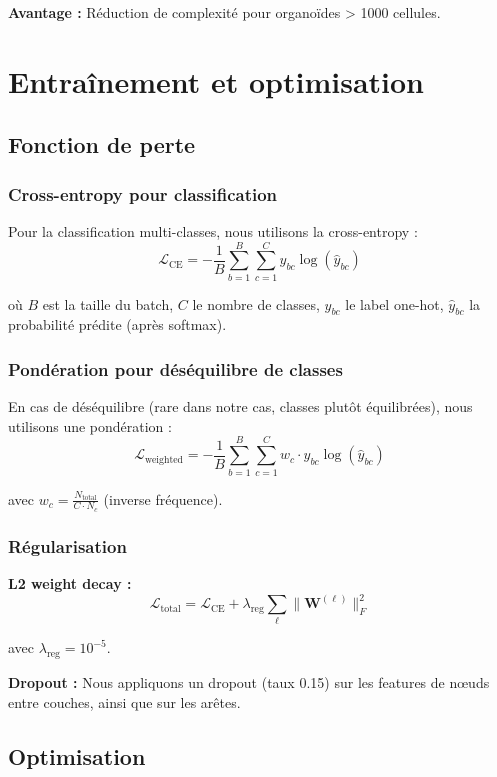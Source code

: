 \textbf{Avantage :} Réduction de complexité pour organoïdes > 1000 cellules.

\section{Entraînement et optimisation}

\subsection{Fonction de perte}

\subsubsection{Cross-entropy pour classification}

Pour la classification multi-classes, nous utilisons la cross-entropy :
\[
\mathcal{L}_{\text{CE}} = -\frac{1}{B}\sum_{b=1}^B \sum_{c=1}^C y_{bc} \log(\hat{y}_{bc})
\]

où $B$ est la taille du batch, $C$ le nombre de classes, $y_{bc}$ le label one-hot, $\hat{y}_{bc}$ la probabilité prédite (après softmax).

\subsubsection{Pondération pour déséquilibre de classes}

En cas de déséquilibre (rare dans notre cas, classes plutôt équilibrées), nous utilisons une pondération :
\[
\mathcal{L}_{\text{weighted}} = -\frac{1}{B}\sum_{b=1}^B \sum_{c=1}^C w_c \cdot y_{bc} \log(\hat{y}_{bc})
\]

avec $w_c = \frac{N_{\text{total}}}{C \cdot N_c}$ (inverse fréquence).

\subsubsection{Régularisation}

\textbf{L2 weight decay :}
\[
\mathcal{L}_{\text{total}} = \mathcal{L}_{\text{CE}} + \lambda_{\text{reg}} \sum_{\ell} \|\mathbf{W}^{(\ell)}\|_F^2
\]

avec $\lambda_{\text{reg}} = 10^{-5}$.

\textbf{Dropout :}
Nous appliquons un dropout (taux 0.15) sur les features de nœuds entre couches, ainsi que sur les arêtes.

\subsection{Optimisation}

